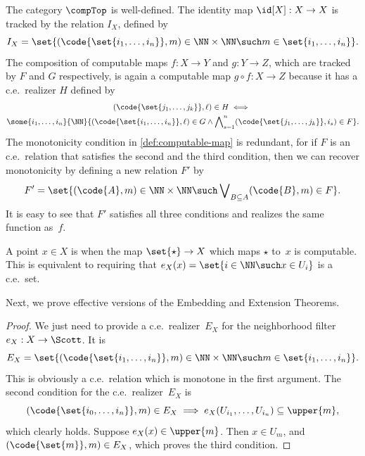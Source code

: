The category $\compTop$ is well-defined. The identity map $\id[X]:
X \to X$ is tracked by the relation $I_X$, defined by
%
\begin{equation*}
  I_X = \set{
    (\code{\set{i_1, \ldots, i_n}}, m) \in \NN \times \NN \such
    m \in \set{i_1, \ldots, i_n}
  }.
\end{equation*}
%
The composition of computable maps $f: X \to Y$ and $g: Y \to Z$,
which are tracked by $F$ and $G$ respectively, is again a computable
map $g \circ f: X \to Z$ because it has a c.e.~realizer $H$ defined by
%
\begin{multline*}
  (\code{\set{j_1, \ldots, j_k}}, \ell) \in H
  \iff {} \\
    \some{i_1, \ldots, i_n}{\NN}{
      (\code{\set{i_1, \ldots, i_n}}, \ell) \in G \land
      \bigwedge\nolimits_{s = 1}^{n}
      (\code{\set{j_1, \ldots, j_k}}, i_s) \in F
    }.
\end{multline*}
%
The monotonicity condition in \cref{def:computable-map} is
redundant, for if $F$ is an c.e.~relation that satisfies the second
and the third condition, then we can recover monotonicity by defining
a new relation $F'$ by
%
\begin{equation*}
  F' = \set{(\code{A}, m) \in \NN \times \NN \such
    \bigvee\nolimits_{B \subseteq A} (\code{B}, m) \in F
  }.
\end{equation*}
%
It is easy to see that $F'$ satisfies all three conditions and
realizes the same function as~$f$.

A point $x \in X$ is  when the map $\set{\star} \to
X$ which maps $\star$ to~$x$ is computable. This is equivalent to
requiring that $e_X(x) = \set{i \in \NN \such x \in U_i}$ is a
c.e.~set.

Next, we prove effective versions of the Embedding and Extension
Theorems.


\begin{proof}
  We just need to provide a c.e.~realizer~$E_X$ for the neighborhood
  filter $e_X : X \to \Scott$. It is
  \begin{equation*}
    E_X = \set{
      (\code{\set{i_1, \ldots, i_n}}, m) \in \NN \times \NN \such
      m \in \set{i_1, \ldots, i_n}
    }.
  \end{equation*}
  This is obviously a c.e.~relation which is monotone in the first
  argument. The second condition for the c.e.~realizer~$E_X$ is
  \begin{equation*}
     (\code{\set{i_0, \ldots, i_n}}, m) \in E_X
     \implies
     e_X(U_{i_1}, \ldots, U_{i_n}) \subseteq \upper{m},
  \end{equation*}
  which clearly holds.
  Suppose $e_X(x) \in \upper{m}$. Then $x \in U_m$, and
  $(\code{\set{m}}, m) \in E_X$, which proves the third condition.
\end{proof}

